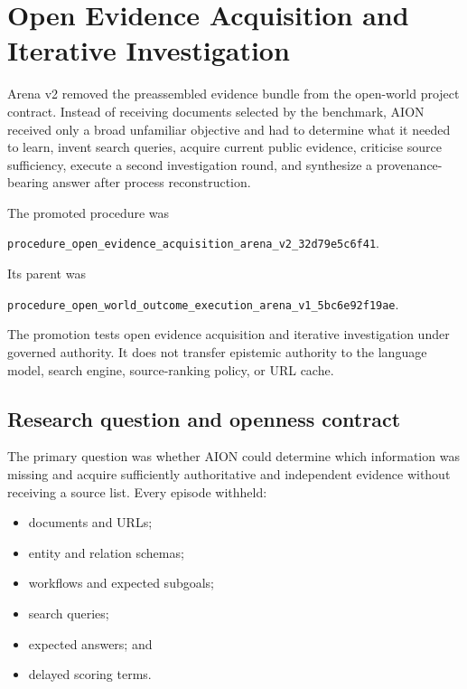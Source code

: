 
\section{Open Evidence Acquisition and Iterative Investigation}
\label{sec:open-evidence-acquisition-arena-v2}

Arena v2 removed the preassembled evidence bundle from the open-world project
contract.  Instead of receiving documents selected by the benchmark, AION
received only a broad unfamiliar objective and had to determine what it needed
to learn, invent search queries, acquire current public evidence, criticise
source sufficiency, execute a second investigation round, and synthesize a
provenance-bearing answer after process reconstruction.

The promoted procedure was
\begin{center}
{\footnotesize\texttt{procedure\_open\_evidence\_acquisition\_arena\_v2\_32d79e5c6f41}}.
\end{center}
Its parent was
\begin{center}
{\footnotesize\texttt{procedure\_open\_world\_outcome\_execution\_arena\_v1\_5bc6e92f19ae}}.
\end{center}

The promotion tests open evidence acquisition and iterative investigation under
governed authority.  It does not transfer epistemic authority to the language
model, search engine, source-ranking policy, or URL cache.


\subsection{Research question and openness contract}
\label{subsec:arena-v2-research-question}

The primary question was whether AION could determine which information was
missing and acquire sufficiently authoritative and independent evidence without
receiving a source list.  Every episode withheld:
\begin{itemize}
  \item documents and URLs;
  \item entity and relation schemas;
  \item workflows and expected subgoals;
  \item search queries;
  \item expected answers; and
  \item delayed scoring terms.
\end{itemize}

